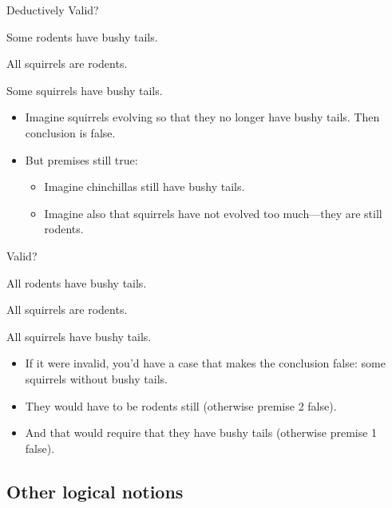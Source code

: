 \begin{frame}{Deductively Valid?}
  \begin{earg}
    \item[] Some rodents have bushy tails.
    \item[] All squirrels are rodents.
    \item[\therefore] Some squirrels have bushy tails.
  \end{earg}
\pause
  \begin{itemize}[<+->]
    \item Imagine squirrels evolving so that they no longer have bushy
    tails. Then conclusion is false.
    \item But premises still true:
    \begin{itemize}[<+->]
      \item Imagine chinchillas still have bushy tails.
      \item Imagine also that squirrels have not evolved too
      much---they are still rodents.
    \end{itemize}
  \end{itemize}
\end{frame}

\begin{frame}{Valid?}
  \begin{earg}
    \item[] All rodents have bushy tails.
    \item[] All squirrels are rodents.
    \item[\therefore] All squirrels have bushy tails.
  \end{earg}
\pause
  \begin{itemize}[<+->]
    \item If it were invalid, you'd have a case that makes the
    conclusion false: some squirrels without bushy tails.
    \item They would have to be rodents still (otherwise premise 2 false).
    \item And that would require that they have bushy tails (otherwise premise 1 false).
  \end{itemize}
\end{frame}

\subsection{Other logical notions}

